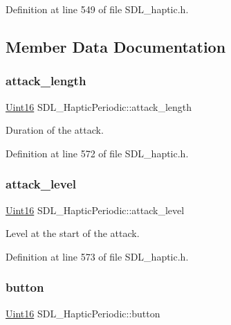 Definition at line 549 of file S\+D\+L\+\_\+haptic.\+h.



\subsection{Member Data Documentation}
\mbox{\label{struct_s_d_l___haptic_periodic_ab35eedce7107edc75640586159fe75bb}} 
\subsubsection{\texorpdfstring{attack\_length}{attack\_length}}
{\footnotesize\ttfamily \mbox{\hyperlink{_s_d_l__stdinc_8h_a31fcc0a076c9068668173ee26d33e42b}{Uint16}} S\+D\+L\+\_\+\+Haptic\+Periodic\+::attack\+\_\+length}

Duration of the attack. 

Definition at line 572 of file S\+D\+L\+\_\+haptic.\+h.

\mbox{\label{struct_s_d_l___haptic_periodic_a79fc2217fea6db6ab3d89ad905d52ccb}} 
\subsubsection{\texorpdfstring{attack\_level}{attack\_level}}
{\footnotesize\ttfamily \mbox{\hyperlink{_s_d_l__stdinc_8h_a31fcc0a076c9068668173ee26d33e42b}{Uint16}} S\+D\+L\+\_\+\+Haptic\+Periodic\+::attack\+\_\+level}

Level at the start of the attack. 

Definition at line 573 of file S\+D\+L\+\_\+haptic.\+h.

\mbox{\label{struct_s_d_l___haptic_periodic_a9e0177354f4a285b8c98e4a31cd31752}} 
\subsubsection{\texorpdfstring{button}{button}}
{\footnotesize\ttfamily \mbox{\hyperlink{_s_d_l__stdinc_8h_a31fcc0a076c9068668173ee26d33e42b}{Uint16}} S\+D\+L\+\_\+\+Haptic\+Periodic\+::button}

